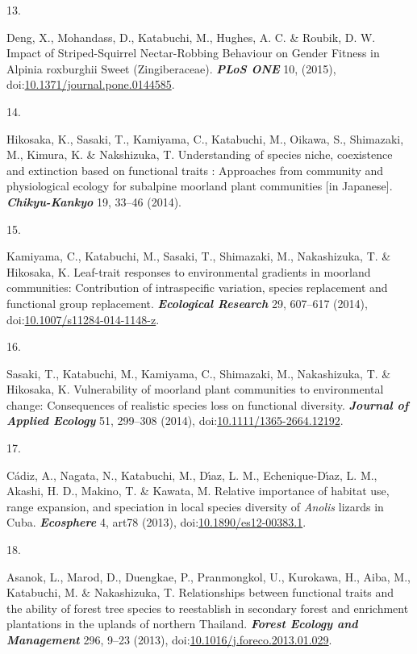 \documentclass[
]{article}
\newlength{\cslhangindent}
\newlength{\csllabelwidth}
\newlength{\cslentryspacingunit} %
\newenvironment{CSLReferences}[2] %
 {%
  \setlength{\parindent}{0pt}
  \ifodd #1
  \let\oldpar\par
  \def\par{\hangindent=\cslhangindent\oldpar}
  \fi
  \setlength{\parskip}{#2\cslentryspacingunit}
 }%
 {}
\newcommand{\CSLLeftMargin}[1]{\parbox[t]{\csllabelwidth}{#1}}
\newcommand{\CSLRightInline}[1]{\parbox[t]{\linewidth - \csllabelwidth}{#1}\break}
\begin{document}
\begin{CSLReferences}{0}{0}
\leavevmode{}%
\CSLLeftMargin{13. }
\CSLRightInline{Deng, X., Mohandass, D., Katabuchi, M., Hughes, A. C. \&
Roubik, D. W. Impact of {Striped}-{Squirrel Nectar}-{Robbing Behaviour}
on {Gender Fitness} in {Alpinia} roxburghii {Sweet} ({Zingiberaceae}).
\textbf{\emph{PLoS ONE}} 10, (2015),
doi:\href{https://doi.org/10.1371/journal.pone.0144585}{10.1371/journal.pone.0144585}.}

\leavevmode{}%
\CSLLeftMargin{14. }
\CSLRightInline{Hikosaka, K., Sasaki, T., Kamiyama, C., Katabuchi, M.,
Oikawa, S., Shimazaki, M., Kimura, K. \& Nakshizuka, T. Understanding of
species niche, coexistence and extinction based on functional traits :
Approaches from community and physiological ecology for subalpine
moorland plant communities {[}in {Japanese}{]}.
\textbf{\emph{Chikyu-Kankyo}} 19, 33--46 (2014).}

\leavevmode{}%
\CSLLeftMargin{15. }
\CSLRightInline{Kamiyama, C., Katabuchi, M., Sasaki, T., Shimazaki, M.,
Nakashizuka, T. \& Hikosaka, K. Leaf-trait responses to environmental
gradients in moorland communities: Contribution of intraspecific
variation, species replacement and functional group replacement.
\textbf{\emph{Ecological Research}} 29, 607--617 (2014),
doi:\href{https://doi.org/10.1007/s11284-014-1148-z}{10.1007/s11284-014-1148-z}.}

\leavevmode{}%
\CSLLeftMargin{16. }
\CSLRightInline{Sasaki, T., Katabuchi, M., Kamiyama, C., Shimazaki, M.,
Nakashizuka, T. \& Hikosaka, K. Vulnerability of moorland plant
communities to environmental change: Consequences of realistic species
loss on functional diversity. \textbf{\emph{Journal of Applied Ecology}}
51, 299--308 (2014),
doi:\href{https://doi.org/10.1111/1365-2664.12192}{10.1111/1365-2664.12192}.}

\leavevmode{}%
\CSLLeftMargin{17. }
\CSLRightInline{Cádiz, A., Nagata, N., Katabuchi, M., Dı́az, L. M.,
Echenique-Dı́az, L. M., Akashi, H. D., Makino, T. \& Kawata, M. Relative
importance of habitat use, range expansion, and speciation in local
species diversity of {\emph{Anolis}} lizards in {Cuba}.
\textbf{\emph{Ecosphere}} 4, art78 (2013),
doi:\href{https://doi.org/10.1890/es12-00383.1}{10.1890/es12-00383.1}.}

\leavevmode{}%
\CSLLeftMargin{18. }
\CSLRightInline{Asanok, L., Marod, D., Duengkae, P., Pranmongkol, U.,
Kurokawa, H., Aiba, M., Katabuchi, M. \& Nakashizuka, T. {Relationships
between functional traits and the ability of forest tree species to
reestablish in secondary forest and enrichment plantations in the
uplands of northern Thailand}. \textbf{\emph{Forest Ecology and
Management}} 296, 9--23 (2013),
doi:\href{https://doi.org/10.1016/j.foreco.2013.01.029}{10.1016/j.foreco.2013.01.029}.}


\end{CSLReferences}
\end{document}
